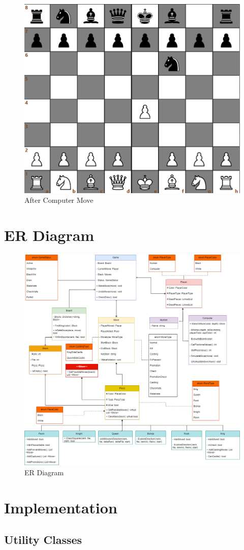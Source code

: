 \documentclass[a4paper,12pt]{article}
\begin{document}
\begin{figure}[H]
    \centering
    \includegraphics[width=0.6\linewidth]{Images/Test Cases/testCase10Img2.png}
    \caption{After Computer Move}
    \label{fig:AfterComputerMove}
\end{figure}

\section{ER Diagram}

\begin{figure}[H]
    \centering
    \includegraphics[width=0.7\linewidth]{Images/ERD.png}
    \caption{ER Diagram}
    \label{fig:entityRelationDiagram}
\end{figure}

\section{Implementation}

\subsection{Utility Classes}
\end{document}
